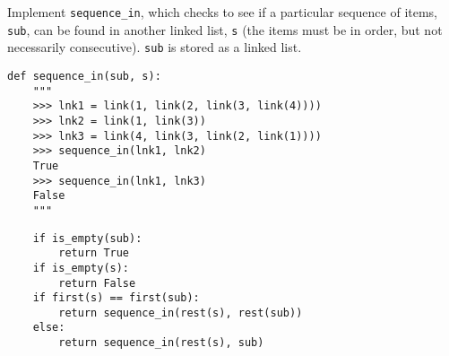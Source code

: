 \begin{blocksection}
\question Implement \lstinline$sequence_in$, which checks to see if a particular sequence of
items, \lstinline$sub$, can be found in another linked list, \lstinline$s$ (the items must be
in order, but not necessarily consecutive). \lstinline$sub$ is stored as a linked list.

\begin{lstlisting}
def sequence_in(sub, s):
    """
    >>> lnk1 = link(1, link(2, link(3, link(4))))
    >>> lnk2 = link(1, link(3))
    >>> lnk3 = link(4, link(3, link(2, link(1))))
    >>> sequence_in(lnk1, lnk2)
    True
    >>> sequence_in(lnk1, lnk3)
    False
    """
\end{lstlisting}

\begin{solution}[2in]
\begin{lstlisting}
    if is_empty(sub):
        return True
    if is_empty(s):
        return False
    if first(s) == first(sub):
        return sequence_in(rest(s), rest(sub))
    else: 
        return sequence_in(rest(s), sub)
\end{lstlisting}
\end{solution}
\end{blocksection}
